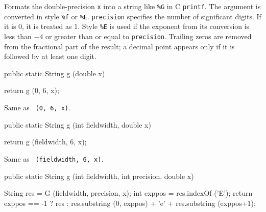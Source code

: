 \begin{tabb} Formats the double-precision \texttt{x} into a string like
\texttt{\%G} in C \texttt{printf}.
The argument is converted in style \texttt{\%f} or \texttt{\%E}.
\texttt{precision} specifies
the number of significant digits.  If it is
0,  it  is treated as 1.  Style \texttt{\%E} is used if the
exponent from its conversion is less than $-4$ or
greater than or equal to \texttt{precision}.  Trailing
zeros are removed from the fractional part of the
result; a decimal point appears only if it is followed
by at least one digit.
%
\end{tabb}
\begin{htmlonly}
\end{htmlonly}
\begin{code}

   public static String g (double x)\begin{hide} {
        return g (0, 6, x);
   }\end{hide}
\end{code}
\begin{tabb}   Same as ~\texttt{(0, 6, x)}.
\end{tabb}
\begin{htmlonly}
\end{htmlonly}
\begin{code}

   public static String g (int fieldwidth, double x)\begin{hide} {
        return g (fieldwidth, 6, x);
   }\end{hide}
\end{code}
\begin{tabb}   Same as ~\texttt{(fieldwidth, 6, x)}.
\end{tabb}
\begin{htmlonly}
\end{htmlonly}
\begin{code}

   public static String g (int fieldwidth, int precision, double x)\begin{hide} {
        String res = G (fieldwidth, precision, x);
        int exppos = res.indexOf ('E');
        return exppos == -1 ? res :
            res.substring (0, exppos) + 'e' + res.substring (exppos+1);
   }\end{hide}
\end{code}
